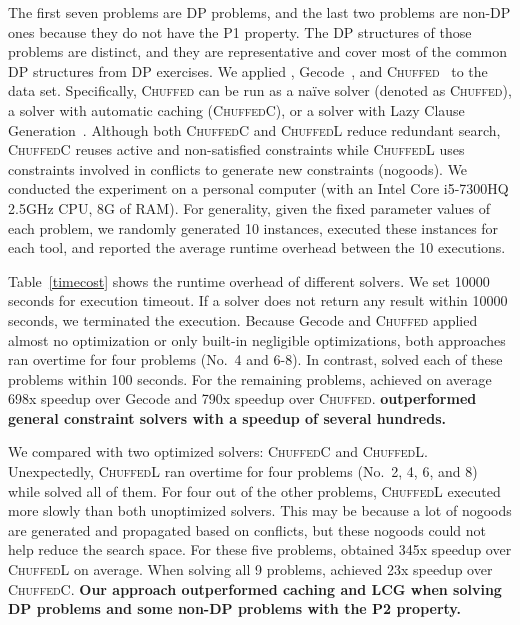The first seven problems are DP problems, and the last two problems are non-DP ones because they do not have the P1 property. The DP structures of those problems are distinct, and they are representative and cover most of the common DP structures from DP exercises.
We applied \tool, Gecode~\cite{schulte2006gecode}, and \textsc{Chuffed}~\cite{chu2012exploiting} to the data set. Specifically,
\textsc{Chuffed} can be run as a na\"ive solver (denoted as \textsc{Chuffed}), a solver with automatic caching (\textsc{ChuffedC}), or a solver with Lazy Clause Generation~\cite{ohrimenko2009propagation}. Although both \textsc{ChuffedC} and \textsc{ChuffedL} reduce redundant search, \textsc{ChuffedC} reuses active and non-satisfied constraints while \textsc{ChuffedL} uses constraints involved in conflicts to generate new constraints (nogoods). 
We conducted the experiment 
on a personal computer (with an Intel Core i5-7300HQ 2.5GHz CPU, 8G of RAM). For generality, given the fixed parameter values of each problem, we randomly generated 10 instances, executed these instances for each tool, and reported the average runtime overhead between the 10 executions.

Table~\ref{timecost} shows the runtime overhead of different solvers. 
We set 10000 seconds for execution timeout. If a solver does not return any result within 10000 seconds, we terminated the execution. Because Gecode and \textsc{Chuffed} applied almost no optimization or only built-in negligible optimizations, both approaches ran overtime for four problems (No.~4 and 6-8). In contrast, \tool solved each of these problems within 100 seconds. 
For the remaining problems, \tool achieved on average 698x speedup over Gecode and 790x speedup over \textsc{Chuffed}. \textbf{\tool outperformed general constraint solvers with a speedup of several hundreds. }

We compared \tool with two optimized solvers: \textsc{ChuffedC} and \textsc{ChuffedL}. Unexpectedly, \textsc{ChuffedL} ran overtime for four problems (No.~2, 4, 6, and 8) while \tool solved all of them. 
For four out of the other problems, \textsc{ChuffedL} executed more slowly than both unoptimized solvers. This may be because a lot of nogoods are generated and propagated based on conflicts, but these nogoods could not help reduce the search space. 
For these five problems, \tool obtained 345x speedup over \textsc{ChuffedL} on average.
When solving all 9 problems, \tool achieved 23x speedup
over \textsc{ChuffedC}. %
\textbf{Our approach outperformed caching and LCG when solving DP problems and some non-DP problems with the P2 property.}

